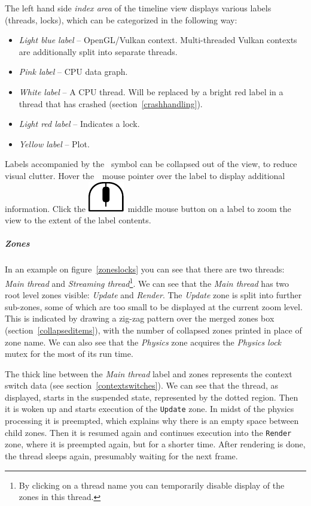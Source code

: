 \documentclass[hidelinks,titlepage,a4paper]{article}
\newcommand{\MMB}{\includegraphics[height=.8\baselineskip]{icons/mmb}}
\begin{document}
The left hand side \emph{index area} of the timeline view displays various labels (threads, locks), which can be categorized in the following way:

\begin{itemize}
\item \emph{Light blue label} -- OpenGL/Vulkan context. Multi-threaded Vulkan contexts are additionally split into separate threads.
\item \emph{Pink label} -- CPU data graph.
\item \emph{White label} -- A CPU thread. Will be replaced by a bright red label in a thread that has crashed (section~\ref{crashhandling}).
\item \emph{Light red label} -- Indicates a lock.
\item \emph{Yellow label} -- Plot.
\end{itemize}

Labels accompanied by the \faCaretDown{}~symbol can be collapsed out of the view, to reduce visual clutter. Hover the~\faMousePointer{}~mouse pointer over the label to display additional information. Click the \MMB{}~middle mouse button on a label to zoom the view to the extent of the label contents.

\subparagraph{Zones}

In an example on figure~\ref{zoneslocks} you can see that there are two threads: \emph{Main thread} and \emph{Streaming thread}\footnote{By clicking on a thread name you can temporarily disable display of the zones in this thread.}. We can see that the \emph{Main thread} has two root level zones visible: \emph{Update} and \emph{Render}. The \emph{Update} zone is split into further sub-zones, some of which are too small to be displayed at the current zoom level. This is indicated by drawing a zig-zag pattern over the merged zones box (section~\ref{collapseditems}), with the number of collapsed zones printed in place of zone name. We can also see that the \emph{Physics} zone acquires the \emph{Physics lock} mutex for the most of its run time.

The thick line between the \emph{Main thread} label and zones represents the context switch data (see section~\ref{contextswitches}). We can see that the thread, as displayed, starts in the suspended state, represented by the dotted region. Then it is woken up and starts execution of the \texttt{Update} zone. In midst of the physics processing it is preempted, which explains why there is an empty space between child zones. Then it is resumed again and continues execution into the \texttt{Render} zone, where it is preempted again, but for a shorter time. After rendering is done, the thread sleeps again, presumably waiting for the next frame.
\end{document}
